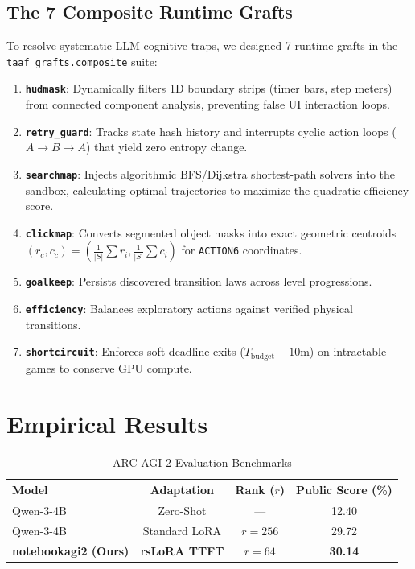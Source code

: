 \documentclass[10pt,journal,compsoc]{IEEEtran}
\begin{document}
\subsection{The 7 Composite Runtime Grafts}
To resolve systematic LLM cognitive traps, we designed 7 runtime grafts in the \texttt{taaf\_grafts.composite} suite:
\begin{enumerate}
    \item \textbf{\texttt{hudmask}}: Dynamically filters 1D boundary strips (timer bars, step meters) from connected component analysis, preventing false UI interaction loops.
    \item \textbf{\texttt{retry\_guard}}: Tracks state hash history and interrupts cyclic action loops ($A \to B \to A$) that yield zero entropy change.
    \item \textbf{\texttt{searchmap}}: Injects algorithmic BFS/Dijkstra shortest-path solvers into the sandbox, calculating optimal trajectories to maximize the quadratic efficiency score.
    \item \textbf{\texttt{clickmap}}: Converts segmented object masks into exact geometric centroids $(r_c, c_c) = (\frac{1}{|S|}\sum r_i, \frac{1}{|S|}\sum c_i)$ for \texttt{ACTION6} coordinates.
    \item \textbf{\texttt{goalkeep}}: Persists discovered transition laws across level progressions.
    \item \textbf{\texttt{efficiency}}: Balances exploratory actions against verified physical transitions.
    \item \textbf{\texttt{shortcircuit}}: Enforces soft-deadline exits ($T_{\text{budget}} - 10\text{m}$) on intractable games to conserve GPU compute.
\end{enumerate}

\section{Empirical Results}
\begin{table}[ht]
\centering
\caption{ARC-AGI-2 Evaluation Benchmarks}
\label{tab:arc2}
\begin{tabular}{lccc}
\toprule
Model & Adaptation & Rank ($r$) & Public Score (\%) \\
\midrule
Qwen-3-4B & Zero-Shot & --- & 12.40 \\
Qwen-3-4B & Standard LoRA & $r=256$ & 29.72 \\
\textbf{notebookagi2 (Ours)} & \textbf{rsLoRA TTFT} & \textbf{$r=64$} & \textbf{30.14} \\
\bottomrule
\end{tabular}
\end{table}
\end{document}
